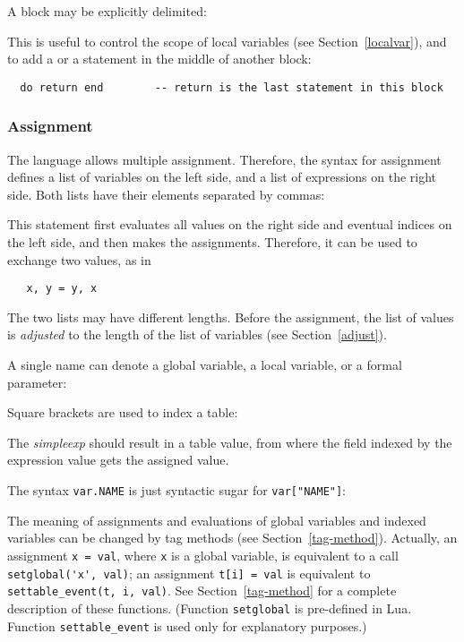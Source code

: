 \documentclass[11pt]{article}
\newcommand{\See}[1]{Section~\ref{#1}}
\newcommand{\see}[1]{(see \See{#1})}
\newcommand{\M}[1]{\emph{#1}}
\newcommand{\T}[1]{{\tt #1}}
\newcommand{\Index}[1]{#1\index{#1}}
\begin{document}
A block may be explicitly delimited:
\begin{Produc}
\end{Produc}%
This is useful to control the scope of local variables \see{localvar},
and to add a  or a  statement in the middle
of another block:
\begin{verbatim}
  do return end        -- return is the last statement in this block
\end{verbatim}

\subsubsection{\Index{Assignment}} \label{assignment}
The language allows \Index{multiple assignment}.
Therefore, the syntax for assignment
defines a list of variables on the left side,
and a list of expressions on the right side.
Both lists have their elements separated by commas:
\begin{Produc}
\end{Produc}%
This statement first evaluates all values on the right side
and eventual indices on the left side,
and then makes the assignments.
Therefore, it can be used to exchange two values, as in
\begin{verbatim}
   x, y = y, x
\end{verbatim}
The two lists may have different lengths.
Before the assignment, the list of values is \emph{adjusted} to
the length of the list of variables \see{adjust}.

A single name can denote a global variable, a local variable,
or a formal parameter:
\begin{Produc}
\end{Produc}%
Square brackets are used to index a table:
\begin{Produc}
\end{Produc}%
The \M{simpleexp} should result in a table value,
from where the field indexed by the expression
value gets the assigned value.

The syntax \verb|var.NAME| is just syntactic sugar for
\verb|var["NAME"]|:
\begin{Produc}
\end{Produc}%

The meaning of assignments and evaluations of global variables and
indexed variables can be changed by tag methods \see{tag-method}.
Actually,
an assignment \verb|x = val|, where \verb|x| is a global variable,
is equivalent to a call \verb|setglobal('x', val)|;
an assignment \verb|t[i] = val| is equivalent to
\verb|settable_event(t, i, val)|.
See \See{tag-method} for a complete description of these functions.
(Function \verb|setglobal| is pre-defined in Lua.
Function \T{settable\_event} is used only for explanatory purposes.)
\end{document}
